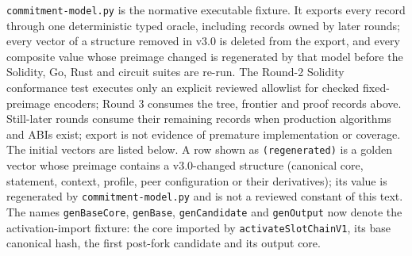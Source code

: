 \documentclass[a4paper,11pt]{article}
\newcommand{\code}[1]{\nolinkurl{#1}}
\begin{document}
\code{commitment-model.py} is the normative executable fixture.  It exports
every record through one deterministic typed oracle, including records owned
by later rounds; every vector of a structure removed in v3.0 is deleted from
the export, and every composite value whose preimage changed is regenerated
by that model before the Solidity, Go, Rust and circuit suites are re-run.  The Round-2 Solidity conformance test executes only an explicit
reviewed allowlist for checked fixed-preimage encoders; Round 3 consumes the
tree, frontier and proof records above.  Still-later rounds consume their
remaining records when production algorithms and ABIs exist; export is not
evidence of premature implementation or coverage.  The initial vectors are
listed below.  A row shown as \code{(regenerated)} is a golden vector whose
preimage contains a v3.0-changed structure (canonical core, statement,
context, profile, peer configuration or their derivatives); its value is
regenerated by \code{commitment-model.py} and is not a reviewed constant of
this text.  The names \code{genBaseCore}, \code{genBase},
\code{genCandidate} and \code{genOutput} now denote the activation-import
fixture: the core imported by \code{activateSlotChainV1}, its base
canonical hash, the first post-fork candidate and its output core.
\end{document}
